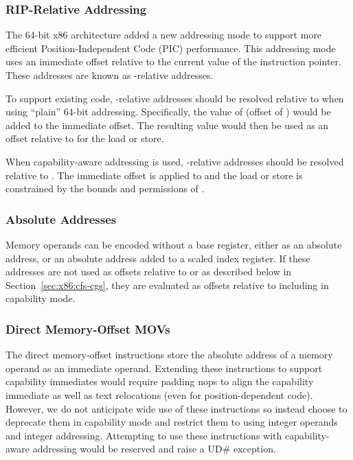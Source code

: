 \subsubsection{RIP-Relative Addressing}

The 64-bit x86 architecture added a new addressing mode to support more
efficient Position-Independent Code (PIC) performance.
This addressing mode uses an immediate offset
relative to the current value of the instruction
pointer.  These addresses are known as \RIP{}-relative addresses.

To support existing code, \RIP{}-relative addresses should be resolved
relative to \DDC{} when using ``plain'' 64-bit addressing.
Specifically, the value of \RIP{} (offset of \CIP{}) would be added to
the immediate offset.  The resulting value would then be used as an
offset relative to \DDC{} for the load or store.

When capability-aware addressing is used, \RIP{}-relative addresses
should be resolved relative to \CIP{}.
The immediate offset is applied to \CIP{} and the load
or store is constrained by the bounds and permissions of \CIP{}.

\subsubsection{Absolute Addresses}

Memory operands can be encoded without a base register, either as an
absolute address, or an absolute address added to a scaled index
register.  If these addresses are not used as offsets relative to
\CFS{} or \CGS{} as described below in Section~\ref{sec:x86:cfs-cgs},
they are evaluated as offsets relative to
\DDC{} including in capability mode.

\subsubsection{Direct Memory-Offset MOVs}

The direct memory-offset  instructions store the
absolute address of a memory operand as an immediate operand.
Extending these instructions to support capability immediates would
require padding nops to align the capability immediate as well as text
relocations (even for position-dependent code).  However, we do not
anticipate wide use of these instructions so instead choose to
deprecate them in capability mode and restrict them to using integer
operands and integer addressing.  Attempting to use these instructions
with capability-aware addressing would be reserved and raise a UD\#
exception.

